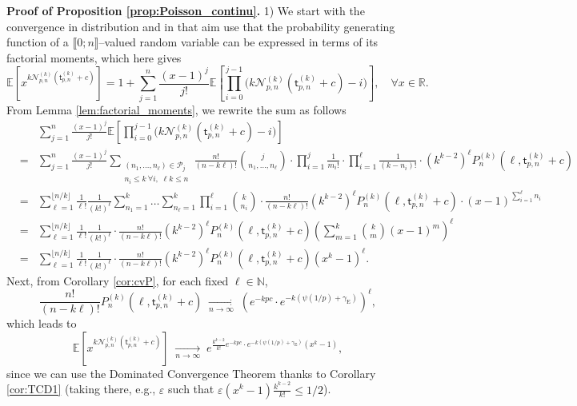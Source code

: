 \documentclass[a4, 11pt]{article}
\numberwithin{equation}{section}
\theoremstyle{plain}
\theoremstyle{definition}
\theoremstyle{remark}
\begin{document}
\bigskip

\textbf{Proof of Proposition \ref{prop:Poisson_continu}.}
1) We start with the convergence in distribution and in that aim use that the probability generating function of a $\llbracket 0 ; n \rrbracket $--valued random variable can be expressed in terms of its factorial moments, which here gives
$$
\mathbb E\left[x^{k \mathcal N^{(k)}_{p,n}(\mathsf t^{(k)}_{p,n}+c)} \right]=1 + \sum_{j=1}^{n}  \frac{(x-1)^{j}}{j!}  \mathbb E\left[\prod_{i=0}^{j-1}\big(k \mathcal N_{p,n}^{(k)}(\mathsf t^{(k)}_{p,n}+c)-i\big) \right], \quad \forall x \in \mathbb R.
$$
From Lemma \ref{lem:factorial_moments}, we rewrite the sum as follows
\begin{eqnarray*}
&& \sum_{j=1}^{n}  \frac{(x-1)^{j}}{j!} \mathbb E\left[\prod_{i=0}^{j-1}\big(k \mathcal N_{p,n}^{(k)}(\mathsf t^{(k)}_{p,n}+c)-i\big) \right] \\
& =& \sum_{j=1}^{n} \frac{ (x-1)^{j}}{j!} \sum_{\substack{(n_1,\ldots,n_\ell) \in \mathcal P_j  \\ n_i \leq k \: \forall i, \; \ell k\leq n}} \frac{n!}{(n-k\ell)!} \binom{j}{n_1,\ldots,n_\ell} \cdot \prod_{i=1}^j \frac{1}{m_i!} \cdot \prod_{i=1}^\ell \frac{1}{(k-n_i)!} \cdot (k^{k-2})^\ell P^{(k)}_n(\ell,\mathsf t^{(k)}_{p,n}+c) \\
&=& \sum_{\ell=1}^{\lfloor n/k\rfloor} \frac{1}{\ell !} \frac{1}{(k!)^{\ell}}\sum_{n_1=1}^k\ldots  \sum_{n_{\ell}=1}^k \prod_{i=1}^{\ell}\binom{k}{n_i} \cdot \frac{n!}{(n-k\ell)!}  (k^{k-2})^{\ell} P^{(k)}_n(\ell,\mathsf t^{(k)}_{p,n}+c) \cdot (x-1)^{\sum_{i=1}^{\ell}n_i} \\
&=& \sum_{\ell=1}^{\lfloor n/k\rfloor} \frac{1}{\ell !} \frac{1}{(k!)^{\ell}}  \cdot \frac{n!}{(n-k\ell)!}  (k^{k-2})^{\ell} P^{(k)}_n(\ell,\mathsf t^{(k)}_{p,n}+c) \left( \sum_{m=1}^k \binom{k}{m} (x-1)^{m}\right)^\ell \\
&=&  \sum_{\ell=1}^{\lfloor n/k\rfloor} \frac{1}{\ell !} \frac{1}{(k!)^{\ell}}  \cdot \frac{n!}{(n-k\ell)!}  (k^{k-2})^{\ell} P^{(k)}_n(\ell,\mathsf t^{(k)}_{p,n}+c) (x^k-1)^\ell.
\end{eqnarray*}
Next, from Corollary \ref{cor:cvP}, for each fixed $\ell \in \mathbb N$,
$$
\frac{n!}{(n-k\ell)!}  P^{(k)}_n(\ell,\mathsf t^{(k)}_{p,n}+c)  \; \underset{n \rightarrow \infty} \longrightarrow \;  \left( e^{-kpc} \cdot e^{-k\left(\psi(1/p)+\gamma_{\mathrm E} \right)}\right)^{\ell},
$$
which leads to 
$$
\mathbb E\left[x^{k \mathcal N^{(k)}_{p,n}(\mathsf t^{(k)}_{p,n}+c)} \right] \; \underset{n \rightarrow \infty} \longrightarrow \; e^{\frac{k^{k-2}}{k!} e^{-kpc} \cdot e^{-k\left(\psi(1/p)+\gamma_{\mathrm E} \right)}(x^k-1)}, 
$$
since we can use the Dominated Convergence Theorem thanks to Corollary \ref{cor:TCD1} (taking there, e.g., $\varepsilon$ such that $\varepsilon (x^k-1) \frac{k^{k-2}}{k!} \leq 1/2$).
\end{document}
